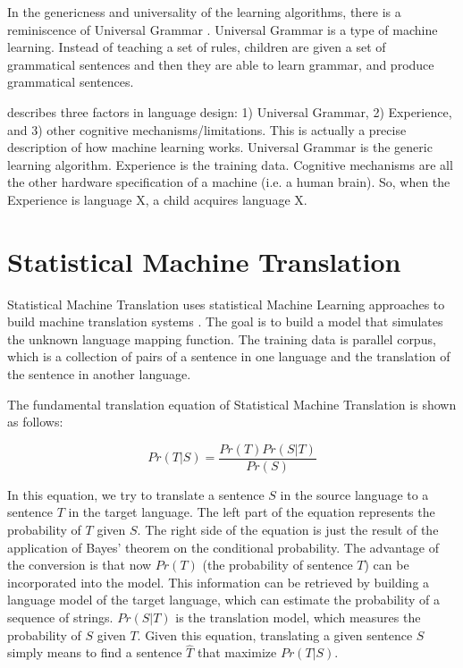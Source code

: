 \documentclass[final]{ua-thesis}
\numberwithin{equation}{section}
\begin{document}
In the genericness and universality of the learning algorithms, there is a reminiscence of Universal Grammar \citep{chomsky2007}. 
Universal Grammar is a type of machine learning. Instead of teaching a set of rules, children are given a set of grammatical sentences and then they are able to learn grammar, and produce grammatical sentences. 

\citet{chom2005_three_factors} describes three factors in language design: 1) Universal Grammar, 2) Experience, and 3) other cognitive mechanisms/limitations. This is actually a precise description of how machine learning works. Universal Grammar is the generic learning algorithm. Experience is the training data. Cognitive mechanisms are all the other hardware specification of a machine (i.e. a human brain). So, when the Experience is language X, a child acquires language X.  

  


\section{Statistical Machine Translation}
Statistical Machine Translation uses statistical Machine Learning approaches to build machine translation systems \citep{brown1988statistical, brown1990statistical, brown1993mathematics, koehn2009statistical, moses}. The goal is to build a model that simulates the unknown language mapping function. The training data is parallel corpus, which is a collection of pairs of a sentence in one language and the translation of the sentence in another language.

The fundamental translation equation of Statistical Machine Translation is shown as follows:

\begin{equation}
Pr(T|S)=\frac{Pr(T)Pr(S|T)}{Pr(S)}
\end{equation}

In this equation, we try to translate a sentence $S$ in the source language to a sentence $T$ in the target language. The left part of the equation represents the probability of $T$ given $S$. 
The right side of the equation is just the result of the application of Bayes' theorem on the conditional probability. 
The advantage of the conversion is that now $Pr(T)$ (the probability of sentence $T$) can be incorporated into the model. 
This information can be retrieved by building a language model of the target language, which can estimate the probability of a sequence of strings. $Pr(S|T)$ is the translation model, which measures the probability of $S$ given $T$. 
Given this equation, translating a given sentence $S$ simply means to find a sentence $\hat{T}$ that maximize $Pr(T|S)$.   
\end{document}
